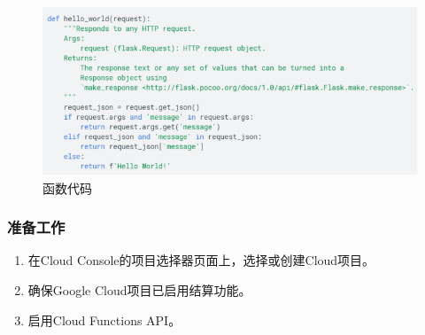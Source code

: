 \documentclass[11pt]{article}
\begin{document}
\begin{figure}[!htbp]
	\centering
	\includegraphics[width=0.7\linewidth]{figs/14.png}
	\caption{函数代码}
	\label{fig14}	
\end{figure}	

\begin{multicols}{2}
\subsubsection{准备工作} 
\begin{enumerate}
	\item 在Cloud Console的项目选择器页面上，选择或创建Cloud项目。
	\item 确保Google Cloud项目已启用结算功能。
	\item 启用Cloud Functions API。
\end{enumerate}


\end{multicols}
\end{document}
